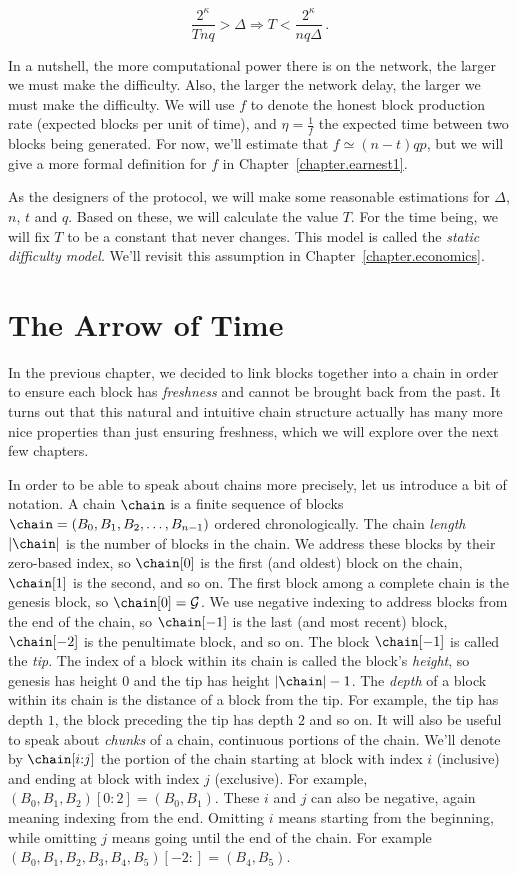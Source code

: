\[
  \frac{2^\kappa}{Tnq} > \Delta \Rightarrow T < \frac{2^\kappa}{nq\Delta}\,.
\]

In a nutshell, the more computational power there is on the network, the larger we must make the difficulty.
Also, the larger the network delay, the larger we must make the difficulty.
We will use $f$ to denote the honest block production rate (expected blocks per unit of time),
and $\eta = \frac{1}{f}$ the expected time between two blocks being generated.
For now, we'll estimate that $f \simeq (n - t)qp$, but we will give a more
formal definition for $f$ in Chapter~\ref{chapter.earnest1}.

As the designers of the protocol, we will make some reasonable estimations for $\Delta$, $n$, $t$ and $q$.
Based on these, we will calculate the value $T$. For the time being, we will fix $T$ to be a constant
that never changes. This model is called the \emph{static difficulty model}. We'll revisit this assumption
in Chapter~\ref{chapter.economics}.

\section{The Arrow of Time}

In the previous chapter, we decided to link blocks together into a chain in order to ensure each block
has \emph{freshness} and cannot be brought back from the past. It turns out that this natural and
intuitive chain structure actually has many more nice properties than just ensuring freshness, which
we will explore over the next few chapters.

In order to be able to speak about chains more precisely,
let us introduce a bit of notation. A chain $\chain$ is a finite sequence of blocks
$\chain = (B_0, B_1, B_2, \ldots, B_{n-1})$ ordered chronologically.
The chain \emph{length} $|\chain|$ is the number of blocks in the chain.
We address these blocks by their zero-based index,
so $\chain[0]$ is the first (and oldest) block on the chain, $\chain[1]$ is the second, and so on.
The first block among a complete chain is the genesis block, so $\chain[0] = \mathcal{G}$.
We use negative indexing to address blocks from the end of the chain, so $\chain[-1]$
is the last (and most recent) block, $\chain[-2]$ is the penultimate block, and so on.
The block $\chain[-1]$ is called the \emph{tip}.
The index of a block within its chain is called the block's \emph{height},
so genesis has height $0$ and the tip has height $|\chain| - 1$.
The \emph{depth} of a block within its chain is the distance of a block
from the tip. For example, the tip has depth $1$, the block preceding the
tip has depth $2$ and so on.
It will also be useful to speak about \emph{chunks} of a chain, continuous portions
of the chain. We'll denote by $\chain[i{:}j]$ the portion of the chain starting at block
with index $i$ (inclusive) and ending at block with index $j$ (exclusive). For example,
$(B_0, B_1, B_2)[0:2] = (B_0, B_1)$. These $i$ and $j$ can also be negative, again meaning
indexing from the end. Omitting $i$ means starting from the beginning, while
omitting $j$ means going until the end of the chain. For example
$(B_0, B_1, B_2, B_3, B_4, B_5)[-2:] = (B_4, B_5)$.

